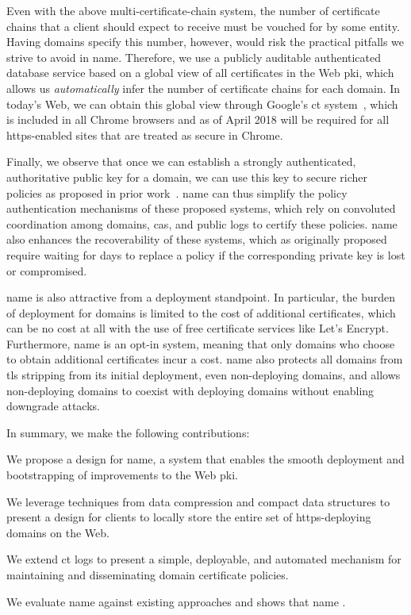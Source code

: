 Even with the above multi-certificate-chain system, the number of certificate
chains that a client should expect to receive must be vouched for by some
entity. Having domains specify this number, however, would risk the practical
pitfalls we strive to avoid in \ac{name}. Therefore, we use a publicly auditable
authenticated database service based on a global view of all certificates in the
Web \ac{pki}, which allows us \emph{automatically} infer the number of
certificate chains for each domain. In today's Web, we can obtain this global
view through Google's \ac{ct} system~\cite{rfc6962}, which is included in all
Chrome browsers and as of April 2018 will be required for all \ac{https}-enabled
sites that are treated as secure in Chrome.

Finally, we observe that once we can establish a strongly authenticated,
authoritative public key for a domain, we can use this key to secure richer
policies as proposed in prior work~\cite{basin2014arpki,
szalachowski2014policert}. \ac{name} can thus simplify the policy authentication
mechanisms of these proposed systems, which rely on convoluted coordination
among domains, \acp{ca}, and public logs to certify these policies. \ac{name}
also enhances the recoverability of these systems, which as originally proposed
require waiting for days to replace a policy if the corresponding private key is
lost or compromised.

\ac{name} is also attractive from a deployment standpoint. In particular, the
burden of deployment for domains is limited to the cost of additional
certificates, which can be no cost at all with the use of free certificate services
like Let's Encrypt. Furthermore,
\ac{name} is an opt-in system, meaning that only domains who choose to obtain
additional certificates incur a cost. \ac{name} also protects all domains from
\ac{tls} stripping from its initial deployment, even non-deploying domains, and
allows non-deploying domains to coexist with deploying domains without enabling
downgrade attacks.

In summary, we make the following contributions:
\begin{compactitem}
\item We propose a design for \ac{name}, a system that enables the smooth
  deployment and bootstrapping of improvements to the Web \ac{pki}.
\item We leverage techniques from data compression and compact data structures
  to present a design for clients to locally store the entire set of
  \ac{https}-deploying domains on the Web.
\item We extend \ac{ct} logs to present a simple, deployable, and automated
  mechanism for maintaining and disseminating domain certificate policies.
\item We evaluate \ac{name} against existing approaches and shows that
  \ac{name} .
\end{compactitem}


